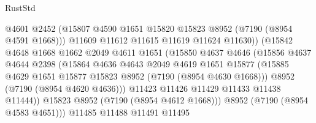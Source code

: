 \begin{lexlean}{RustStd}
\begin{coremodule}
                                  @4601
                                  @2452
                                  (@15807
                                    @4590
                                    @1651
                                    @15820
                                    @15823
                                    @8952
                                    (@7190 (@8954 @4591 @1668)))
                                  @11609
                                  @11612
                                  @11615
                                  @11619
                                  @11624
                                  @11630))
                              (@15842
                                @4648
                                @1668
                                @1662
                                @2049
                                @4611
                                @1651
                                (@15850
                                  @4637
                                  @4646
                                  (@15856
                                    @4637
                                    @4644
                                    @2398
                                    (@15864
                                      @4636
                                      @4643
                                      @2049
                                      @4619
                                      @1651
                                      @15877
                                      (@15885
                                        @4629
                                        @1651
                                        @15877
                                        @15823
                                        @8952
                                        (@7190 (@8954 @4630 @1668)))
                                      @8952
                                      (@7190 (@8954 @4620 @4636)))
                                    @11423
                                    @11426
                                    @11429
                                    @11433
                                    @11438
                                    @11444))
                                @15823
                                @8952
                                (@7190 (@8954 @4612 @1668)))
                              @8952
                              (@7190 (@8954 @4583 @4651)))
                            @11485
                            @11488
                            @11491
                            @11495

\end{coremodule}
\end{lexlean}
